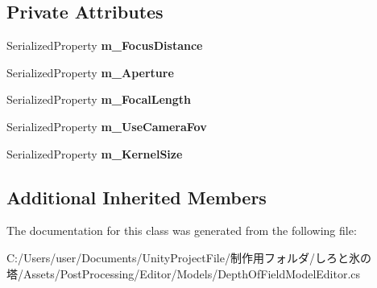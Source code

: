 \subsection*{Private Attributes}
\begin{DoxyCompactItemize}
\item 
\mbox{\label{class_unity_editor_1_1_post_processing_1_1_depth_of_field_model_editor_a54f4bfc96d195d8ec91f5bb911762aec}} 
Serialized\+Property {\bfseries m\+\_\+\+Focus\+Distance}
\item 
\mbox{\label{class_unity_editor_1_1_post_processing_1_1_depth_of_field_model_editor_a0e3dbe704fbfd6a7869fd503fb135142}} 
Serialized\+Property {\bfseries m\+\_\+\+Aperture}
\item 
\mbox{\label{class_unity_editor_1_1_post_processing_1_1_depth_of_field_model_editor_a675464b579b46bf427d3a7e6a6d54904}} 
Serialized\+Property {\bfseries m\+\_\+\+Focal\+Length}
\item 
\mbox{\label{class_unity_editor_1_1_post_processing_1_1_depth_of_field_model_editor_a4f444dcebbaf69f9e5b1761f8a540d94}} 
Serialized\+Property {\bfseries m\+\_\+\+Use\+Camera\+Fov}
\item 
\mbox{\label{class_unity_editor_1_1_post_processing_1_1_depth_of_field_model_editor_ab869dacab7d005918639cf63e6514c21}} 
Serialized\+Property {\bfseries m\+\_\+\+Kernel\+Size}
\end{DoxyCompactItemize}
\subsection*{Additional Inherited Members}


The documentation for this class was generated from the following file\+:\begin{DoxyCompactItemize}
\item 
C\+:/\+Users/user/\+Documents/\+Unity\+Project\+File/制作用フォルダ/しろと氷の塔/\+Assets/\+Post\+Processing/\+Editor/\+Models/Depth\+Of\+Field\+Model\+Editor.\+cs\end{DoxyCompactItemize}
